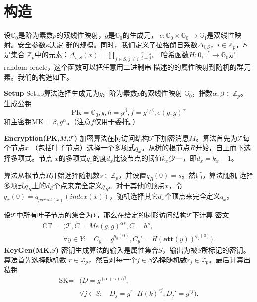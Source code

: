 \section{构造}
设$\mathbb{G}_0$是阶为素数$p$的双线性映射，$g$是$\mathbb{G}_0$的生成元，
$e:\mathbb{G}_0\times \mathbb{G}_0\to\mathbb{G}_1$是双线性映射。安全参数$\kappa$决定
群的规模。同时，我们定义了拉格朗日系数$\Delta_{i,S}$，$i\in\mathbb{Z}_p$，$S$是集合
$\mathbb{Z}_p$中的元素：$\Delta_{i,S}(x)=\prod_{j\in S,j\neq i}\frac{x-j}{i-j}$。
哈希函数$H:{0,1}^*\to \mathbb{G}_0$是random oracle，这个函数可以把任意用二进制串
描述的的属性映射到随机的群元素。我们的构造如下。\par
\vspace{5mm}
\noindent\textbf{Setup}\quad 
Setup算法选择生成元为$g$，阶为素数$p$的双线性映射
$\mathbb{G}_0$，指数$\alpha,\beta\in\mathbb{Z}_p$。生成公钥
$$\textrm{PK} = \mathbb{G}_0,g,h=g^{\beta},f=g^{1/\beta},e(g,g)^{\alpha}$$
和主密钥$\textrm{MK} = \beta,g^\alpha$。（注意$f$仅用于委托。）\par
\vspace{5mm}
\noindent\textbf{Encryption(PK,$M$,$\mathcal{T}$)}\quad
加密算法在树访问结构$\mathcal{T}$下加密消息$M$。算法首先为$\mathcal{T}$每个节点$x$
（包括叶子节点）选择一个多项式$q_x$。从树的根节点$R$开始，自上而下选择多项式。节点
$x$的多项式$q_x$的度$d_x$比该节点的阈值$k_x$少一，即$d_x=k_x-1$。\par
算法从根节点$R$开始选择随机数$s\in\mathbb{Z}_p$，并设置$q_R(0)=s$。然后，算法随机
选择多项式$q_R$上的$d_R$个点来完全定义$q_R$。对于其他的顶点$x$，令
$q_x(0)=q_{parent(x)}(index(x))$，随机选择其它$d_x$个顶点来完全定义$q_x$。\par
设$\mathcal{T}$中所有叶子节点的集合为$Y$，那么在给定的树形访问结构$\mathcal{T}$下计算
密文
\begin{equation*}
\begin{split}
\textrm{CT}=&(\mathcal{T},\widetilde{C}=Me(g,g)^{\alpha s},C=h^s,\\
&\forall y\in Y:\quad C_y=g^{q_y(0)},C_y'=H(\textbf{att}(y))^{q_y(0)}).
\end{split}
\end{equation*}
\vspace{5mm}
\noindent\textbf{KeyGen(MK,$S$)}\quad
密钥生成算法的输入是属性集合$S$，输出为被$S$所标记的密钥。算法首先选择随机数
$r\in \mathcal{Z}_p$，然后对每一个$j\in S$选择随机数$r_j\in \mathcal{Z}_p$。最后计算出
私钥
\begin{equation*}
\begin{split}
\textrm{SK}=&(D=g^{(\alpha+\gamma)/\beta},\\
&\forall j\in S:\quad D_j=g^r\cdot H(k)^{rj},D_j'=g^{rj}).
\end{split}
\end{equation*}

